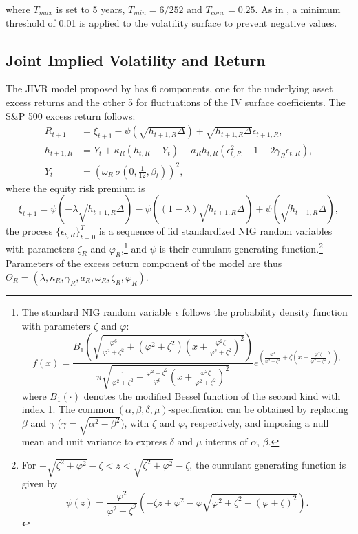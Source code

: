 where $T_{max}$ is set to 5 years, $T_{min}=6/252$ and $T_{conv}=0.25$. As in \cite{dumas1998implied},  a minimum threshold of 0.01 is applied to the volatility surface to prevent negative values.

\subsection{Joint Implied Volatility and Return}\label{subappen:JIVR_timeseries}

The JIVR model proposed by \cite{Frnacois2023} has 6 components, one for the underlying asset excess returns and the other 5 for fluctuations of the IV surface coefficients. The S\&P 500 excess return follows:
 \begin{align}
     R_{t+1} & = \xi_{t+1}-\psi(\sqrt{h_{t+1,R}\Delta}) + \sqrt{h_{t+1,R}\Delta}\epsilon_{t+1,R}, \nonumber\\
     h_{t+1,R} & = Y_{t}+\kappa_{R}(h_{t,R}-Y_{t})+a_{R}h_{t,R}(\epsilon_{t,R}^{2}-1-2\gamma_{R}\epsilon_{t,R}), \label{return}\\
     Y_{t} &= \left(\omega_{R}\, \sigma \left(0,\frac{1}{12},\beta_{t}\right)\right)^2, \nonumber
     \label{returnseries}
 \end{align}
where the equity risk premium is
\begin{equation}
    \xi_{t+1}=\psi(-\lambda\sqrt{h_{t+1,R}\Delta})- \psi((1-\lambda)\sqrt{h_{t+1,R}\Delta}) + \psi(\sqrt{h_{t+1,R}\Delta}),
\end{equation}
the process $\{\epsilon_{t,R}\}^T_{t=0}$ is a sequence of iid standardized NIG random variables with parameters $\zeta_{R}$ and $\varphi_{R}$,\footnote{The standard NIG random variable $\epsilon$ follows the probability density function with parameters $\zeta$ and $\varphi$: $$f(x)=\frac{B_{1}\left( \sqrt{\frac{\varphi^{6}}{\varphi^{2}+\zeta^{2}}+(\varphi^{2}+\zeta^{2})\left(x+ \frac{\varphi^{2}\zeta}{\varphi^{2}+\zeta^{2}} \right)^{2}} \right)}{\pi\sqrt{\frac{1}{\varphi^{2}+\zeta^{2}}+\frac{\varphi^{2}+\zeta^{2}}{\varphi^{6}}\left(x+ \frac{\varphi^{2}\zeta}{\varphi^{2}+\zeta^{2}} \right)^{2}} } e^{\left( \frac{\varphi^{4}}{\varphi^{2}+\zeta^{2}}+\zeta\left(x+ \frac{\varphi^{2}\zeta}{\varphi^{2}+\zeta^{2}} \right) \right),}$$ where $B_{1}(\cdot)$ denotes the modified Bessel function of the second kind with index 1. The common $(\alpha, \beta, \delta, \mu)$-specification can be obtained by replacing $\beta$ and $\gamma$ ($\gamma = \sqrt{\alpha^2-\beta^2}$), with $\zeta$ and $\varphi$, respectively, and imposing a null mean and unit variance to express $\delta$ and $\mu$ interms of $\alpha$, $\beta$.} 
and $\psi$ is their cumulant generating function.\footnote{For $-\sqrt{\zeta^{2}+\varphi^{2}}-\zeta<z<\sqrt{\zeta^{2}+\varphi^{2}}-\zeta$, the cumulant generating function is given by 
$$\psi(z)=\frac{\varphi^{2}}{\varphi^{2}+\zeta^{2}}\left( -\zeta z+\varphi^{2}-\varphi\sqrt{\varphi^{2}+\zeta^{2}-(\varphi+\zeta)^{2}} \right).$$}
Parameters of the excess return component of the model are thus $\Theta_{R} = (\lambda,\kappa_{R},\gamma_{R},a_{R},\omega_{R},\zeta_{R},\varphi_{R})$. 

